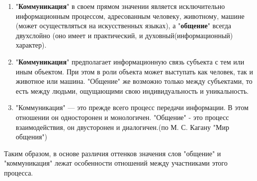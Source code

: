 \begin{enumerate}
    \item "\textbf{Коммуникация}" в своем прямом значении является исключительно информационным процессом, адресованным человеку, животному, машине (может осуществляться на искусственных языках), а "\textbf{общение}" всегда двухслойно (оно имеет и практический, и духовный(информационный) характер).
    \item "\textbf{Коммуникация}" предполагает информационную связь субъекта с тем или иным объектом. При этом в роли объекта может выступать как человек, так и животное или машина. "Общение" же возможно только между субъектами, то есть между людьми, ощущающими свою индивидуальность и уникальность.
    \item "Коммуникация" --- это прежде всего процесс передачи информации. В этом отношении он односторонен и монологичен. "Общение" - это процесс взаимодействия, он двусторонен и диалогичен.(по М. С. Кагану "Мир общения")
\end{enumerate}

Таким образом, в основе различия оттенков значения слов "общение" и
"коммуникация" лежат особенности отношений между участниками этого процесса.

